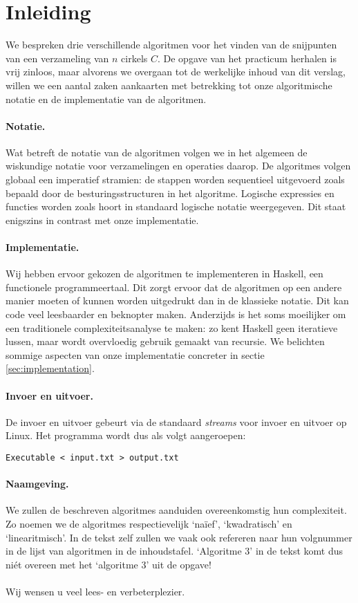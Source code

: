 \section{Inleiding}
We bespreken drie verschillende algoritmen voor het vinden van de
snijpunten van een verzameling van $n$ cirkels $C$. De opgave van het
practicum herhalen is vrij zinloos, maar alvorens we overgaan tot de
werkelijke inhoud van dit verslag, willen we een aantal zaken
aankaarten met betrekking tot onze algoritmische notatie en de
implementatie van de algoritmen.

\paragraph{Notatie.} 
Wat betreft de notatie van de algoritmen volgen we in het algemeen de
wiskundige notatie voor verzamelingen en operaties daarop. De
algoritmes volgen globaal een imperatief stramien: de stappen worden
sequentieel uitgevoerd zoals bepaald door de besturingsstructuren in
het algoritme. Logische expressies en functies worden zoals hoort in
standaard logische notatie weergegeven. Dit staat enigszins in
contrast met onze implementatie.

\paragraph{Implementatie.} 
Wij hebben ervoor gekozen de algoritmen te
implementeren in Haskell, een functionele programmeertaal. Dit zorgt
ervoor dat de algoritmen op een andere manier moeten of kunnen worden
uitgedrukt dan in de klassieke notatie. Dit kan code veel leesbaarder
en beknopter maken. Anderzijds is het soms moeilijker om een
traditionele complexiteitsanalyse te maken: zo kent Haskell geen
iteratieve lussen, maar wordt overvloedig gebruik gemaakt van
recursie. We belichten sommige aspecten van onze implementatie
concreter in sectie \ref{sec:implementation}.

\paragraph{Invoer en uitvoer.} 
De invoer en uitvoer gebeurt via de standaard \textit{streams} voor
invoer en uitvoer op Linux. Het programma wordt dus als volgt
aangeroepen:
\begin{lstlisting}
Executable < input.txt > output.txt
\end{lstlisting}

\paragraph{Naamgeving.} 
We zullen de beschreven algoritmes aanduiden overeenkomstig hun
complexiteit. Zo noemen we de algoritmes respectievelijk `na\"ief',
`kwadratisch' en `linearitmisch'. In de tekst zelf zullen we vaak ook
refereren naar hun volgnummer in de lijst van algoritmen in de
inhoudstafel. `Algoritme 3' in de tekst komt dus ni\'et overeen met
het `algoritme 3' uit de opgave!

\paragraph{} 
Wij wensen u veel lees- en verbeterplezier.